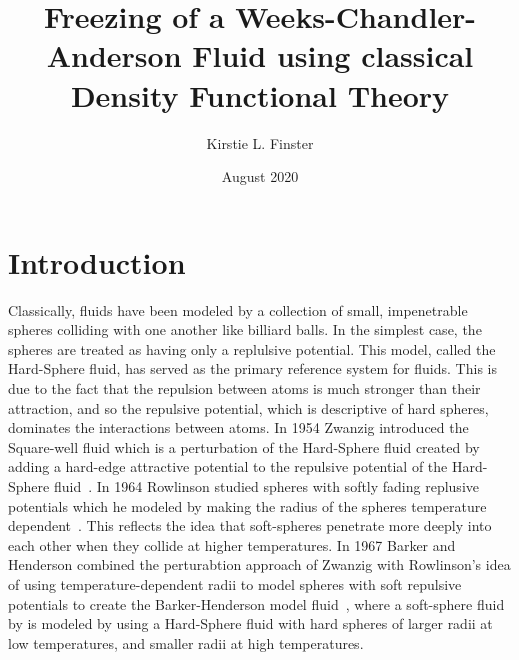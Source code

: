 \documentclass[double,12pt]{beavtex}
\title{Freezing of a Weeks-Chandler-Anderson Fluid using classical Density Functional Theory}
\author{Kirstie L. Finster}
\date{August 2020}
\begin{document}
   \maketitle
   \mainmatter

\chapter{Introduction}

Classically, fluids have been modeled by a collection of small, impenetrable spheres colliding 
with one another like billiard balls. In the simplest case, the spheres are treated as having 
only a replulsive potential. This model, called the Hard-Sphere fluid, has served as the primary 
reference system for fluids. This is due to the fact that the repulsion between atoms is much 
stronger than their attraction, and so the repulsive potential, which is descriptive of 
hard spheres, dominates the interactions between atoms. 
In 1954 Zwanzig introduced the Square-well fluid which is a perturbation of the Hard-Sphere fluid 
created by adding a hard-edge attractive potential to the repulsive potential of the Hard-Sphere 
fluid~\cite{ZwanzigSqrWell}. In 1964 Rowlinson studied spheres with softly fading replusive potentials which he 
modeled by making the radius of the spheres temperature dependent~\cite{rowlinson1964statistical}. 
This reflects the idea that soft-spheres penetrate more deeply into each other 
when they collide at higher temperatures. 
In 1967 Barker and Henderson combined the perturabtion approach of Zwanzig 
with Rowlinson's idea of using temperature-dependent radii to model spheres with 
soft repulsive potentials to create the Barker-Henderson model fluid~\cite{barker1967perturbation}, 
where a soft-sphere fluid by is modeled by using a Hard-Sphere fluid with hard spheres of 
larger radii at low temperatures, and smaller radii at high temperatures. 
%
%
\end{document}
